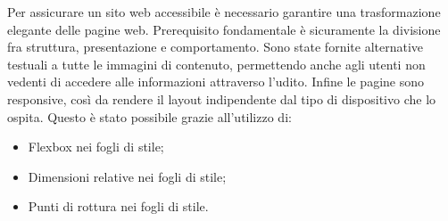 Per assicurare un sito web accessibile è necessario garantire una trasformazione elegante delle pagine web. Prerequisito fondamentale è sicuramente la divisione fra struttura, presentazione e comportamento. Sono state fornite alternative testuali a tutte le immagini di contenuto, permettendo anche agli utenti non vedenti di accedere alle informazioni attraverso l'udito. 
Infine le pagine sono responsive, così da rendere il layout indipendente dal tipo di dispositivo che lo ospita. Questo è stato possibile grazie all'utilizzo di:
\begin{itemize}
\item Flexbox nei fogli di stile;
\item Dimensioni relative nei fogli di stile;
\item Punti di rottura nei fogli di stile.
\end{itemize}